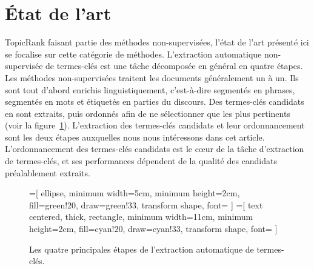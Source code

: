 \section{État de l'art}
\label{sec:etat_de_l_art}
  TopicRank faisant partie des méthodes non-supervisées, l'état de l'art
  présenté ici se focalise sur cette catégorie de méthodes.
  L'extraction automatique non-supervisée de termes-clés est une tâche
  décomposée en général en quatre étapes. Les méthodes non-supervisées traitent
  les documents généralement un à un. Ils sont tout d'abord enrichis
  linguistiquement, c'est-à-dire segmentés en phrases, segmentés en mots 
  et étiquetés en parties du discours. Des termes-clés candidats en sont
  extraits, puis ordonnés afin de ne sélectionner que les plus pertinents (voir
  la figure~\ref{fig:etapes_de_l_extraction_de_termes_cles}). L'extraction des
  termes-clés candidats et leur ordonnancement sont les deux étapes auxquelles
  nous nous intéressons dans cet article. L'ordonnancement des termes-clés
  candidats est le c\oe{}ur de la tâche d'extraction de termes-clés, et ses
  performances dépendent de la qualité des candidats préalablement extraits.
  \begin{figure}
    =[
      ellipse,
      minimum width=5cm,
      minimum height=2cm,
      fill=green!20,
      draw=green!33,
      transform shape,
      font={\huge}
    ]
    =[
      text centered,
      thick,
      rectangle,
      minimum width=11cm,
      minimum height=2cm,
      fill=cyan!20,
      draw=cyan!33,
      transform shape,
      font={\huge\bfseries}
    ]

    \centering
    \caption{Les quatre principales étapes de l'extraction automatique de
             termes-clés. \label{fig:etapes_de_l_extraction_de_termes_cles}}
  \end{figure}

